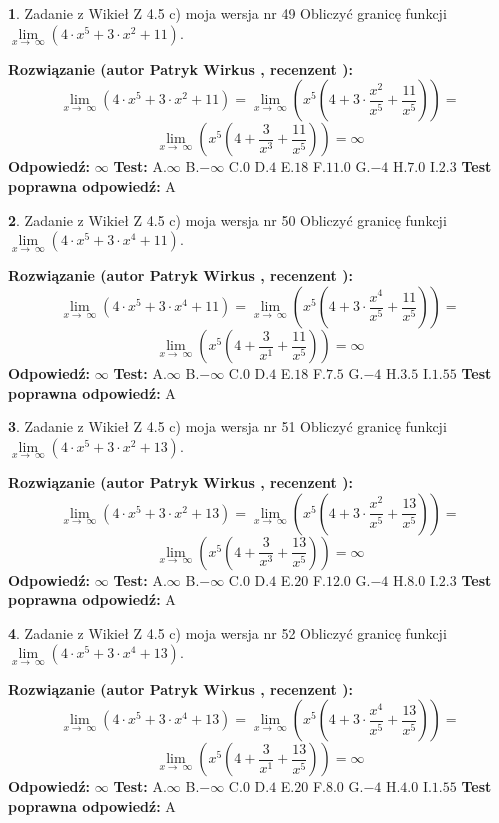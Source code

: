 \documentclass[12pt, a4paper]{article}
\theoremstyle{definition} %
\newtheorem{zad}{}
\newcommand{\zadStart}[1]{\begin{zad}#1\newline}
\newcommand{\zadStop}{\end{zad}}
\newcommand{\rozwStart}[2]{\noindent \textbf{Rozwiązanie (autor #1 , recenzent #2): }\newline}
\newcommand{\rozwStop}{\newline}
\newcommand{\odpStart}{\noindent \textbf{Odpowiedź:}\newline}
\newcommand{\odpStop}{\newline}
\newcommand{\testStart}{\noindent \textbf{Test:}\newline}
\newcommand{\testStop}{\newline}
\newcommand{\kluczStart}{\noindent \textbf{Test poprawna odpowiedź:}\newline}
\newcommand{\kluczStop}{\newline}
\begin{document}
\zadStart{Zadanie z Wikieł Z 4.5 c) moja wersja nr 49}
Obliczyć granicę funkcji  $\lim\limits_{x\to\ \infty}(4 \cdot x^{5}+3 \cdot x^{2}+11)$.
\zadStop
\rozwStart{Patryk Wirkus}{}
$$\lim\limits_{x\to\ \infty}(4 \cdot x^{5}+3 \cdot x^{2}+11) = \lim\limits_{x\to\ \infty}(x^{5}(4 +3 \cdot \frac{x^{2}}{x^{5}}+\frac{11}{x^{5}})) =$$ $$\lim\limits_{x\to\ \infty}(x^{5}(4 +\frac{3}{x^{3}}+\frac{11}{x^{5}})) =\infty$$
\rozwStop
\odpStart
$\infty$
\odpStop
\testStart
A.$\infty$ B.$-\infty$ C.$0$ D.$4$ E.$18$
F.$11.0$ G.$-4$
H.$7.0$
I.$2.3$
\testStop
\kluczStart
A
\kluczStop



\zadStart{Zadanie z Wikieł Z 4.5 c) moja wersja nr 50}
Obliczyć granicę funkcji  $\lim\limits_{x\to\ \infty}(4 \cdot x^{5}+3 \cdot x^{4}+11)$.
\zadStop
\rozwStart{Patryk Wirkus}{}
$$\lim\limits_{x\to\ \infty}(4 \cdot x^{5}+3 \cdot x^{4}+11) = \lim\limits_{x\to\ \infty}(x^{5}(4 +3 \cdot \frac{x^{4}}{x^{5}}+\frac{11}{x^{5}})) =$$ $$\lim\limits_{x\to\ \infty}(x^{5}(4 +\frac{3}{x^{1}}+\frac{11}{x^{5}})) =\infty$$
\rozwStop
\odpStart
$\infty$
\odpStop
\testStart
A.$\infty$ B.$-\infty$ C.$0$ D.$4$ E.$18$
F.$7.5$ G.$-4$
H.$3.5$
I.$1.55$
\testStop
\kluczStart
A
\kluczStop



\zadStart{Zadanie z Wikieł Z 4.5 c) moja wersja nr 51}
Obliczyć granicę funkcji  $\lim\limits_{x\to\ \infty}(4 \cdot x^{5}+3 \cdot x^{2}+13)$.
\zadStop
\rozwStart{Patryk Wirkus}{}
$$\lim\limits_{x\to\ \infty}(4 \cdot x^{5}+3 \cdot x^{2}+13) = \lim\limits_{x\to\ \infty}(x^{5}(4 +3 \cdot \frac{x^{2}}{x^{5}}+\frac{13}{x^{5}})) =$$ $$\lim\limits_{x\to\ \infty}(x^{5}(4 +\frac{3}{x^{3}}+\frac{13}{x^{5}})) =\infty$$
\rozwStop
\odpStart
$\infty$
\odpStop
\testStart
A.$\infty$ B.$-\infty$ C.$0$ D.$4$ E.$20$
F.$12.0$ G.$-4$
H.$8.0$
I.$2.3$
\testStop
\kluczStart
A
\kluczStop



\zadStart{Zadanie z Wikieł Z 4.5 c) moja wersja nr 52}
Obliczyć granicę funkcji  $\lim\limits_{x\to\ \infty}(4 \cdot x^{5}+3 \cdot x^{4}+13)$.
\zadStop
\rozwStart{Patryk Wirkus}{}
$$\lim\limits_{x\to\ \infty}(4 \cdot x^{5}+3 \cdot x^{4}+13) = \lim\limits_{x\to\ \infty}(x^{5}(4 +3 \cdot \frac{x^{4}}{x^{5}}+\frac{13}{x^{5}})) =$$ $$\lim\limits_{x\to\ \infty}(x^{5}(4 +\frac{3}{x^{1}}+\frac{13}{x^{5}})) =\infty$$
\rozwStop
\odpStart
$\infty$
\odpStop
\testStart
A.$\infty$ B.$-\infty$ C.$0$ D.$4$ E.$20$
F.$8.0$ G.$-4$
H.$4.0$
I.$1.55$
\testStop
\kluczStart
A
\kluczStop
\end{document}
